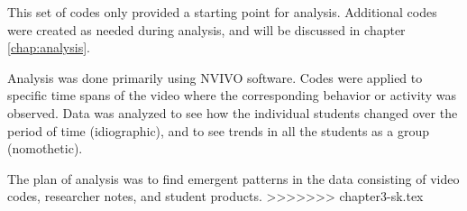 This set of codes only provided a starting point for analysis. Additional codes were created as needed during analysis, and will be discussed in chapter \ref{chap:analysis}. 

Analysis was done primarily using NVIVO software. Codes were applied to specific time spans of the video where the corresponding behavior or activity was observed. Data
was analyzed to see how the individual students changed over the period
of time (idiographic), and to see trends in all the students as a group
(nomothetic).

The plan of analysis was to find emergent patterns in the data consisting of video codes, researcher notes, and student products. 
>>>>>>> chapter3-sk.tex
